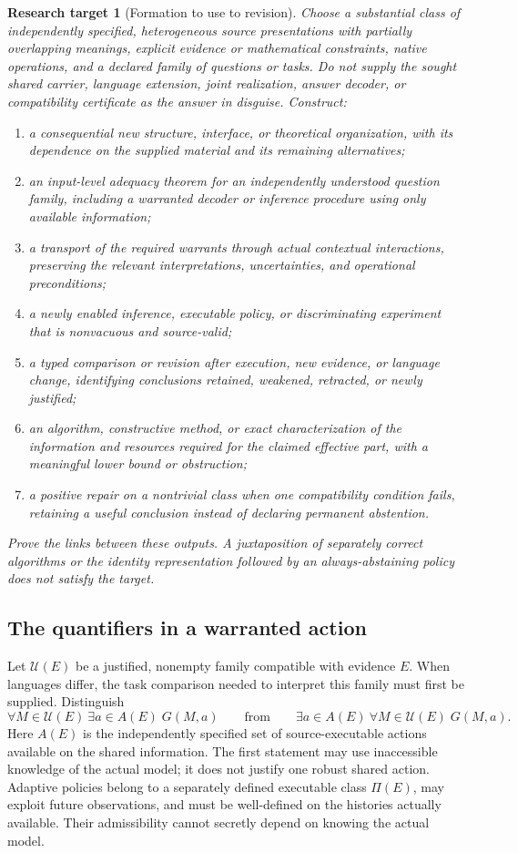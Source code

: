 \documentclass[11pt]{article}
\newtheorem{target}{Research target}[section]
\theoremstyle{definition}
\begin{document}
\begin{target}[Formation to use to revision]
Choose a substantial class of independently specified, heterogeneous source presentations with partially overlapping meanings, explicit evidence or mathematical constraints, native operations, and a declared family of questions or tasks. Do not supply the sought shared carrier, language extension, joint realization, answer decoder, or compatibility certificate as the answer in disguise. Construct:
\begin{enumerate}
\item a consequential new structure, interface, or theoretical organization, with its dependence on the supplied material and its remaining alternatives;
\item an input-level adequacy theorem for an independently understood question family, including a warranted decoder or inference procedure using only available information;
\item a transport of the required warrants through actual contextual interactions, preserving the relevant interpretations, uncertainties, and operational preconditions;
\item a newly enabled inference, executable policy, or discriminating experiment that is nonvacuous and source-valid;
\item a typed comparison or revision after execution, new evidence, or language change, identifying conclusions retained, weakened, retracted, or newly justified;
\item an algorithm, constructive method, or exact characterization of the information and resources required for the claimed effective part, with a meaningful lower bound or obstruction;
\item a positive repair on a nontrivial class when one compatibility condition fails, retaining a useful conclusion instead of declaring permanent abstention.
\end{enumerate}
Prove the links between these outputs. A juxtaposition of separately correct algorithms or the identity representation followed by an always-abstaining policy does not satisfy the target.
\end{target}

\subsection{The quantifiers in a warranted action}

Let $\mathcal U(E)$ be a justified, nonempty family compatible with evidence $E$. When languages differ, the task comparison needed to interpret this family must first be supplied. Distinguish
\[
 \forall M\in\mathcal U(E)\ \exists a\in A(E)\;G(M,a)
 \qquad\text{from}\qquad
 \exists a\in A(E)\ \forall M\in\mathcal U(E)\;G(M,a).
\]
Here $A(E)$ is the independently specified set of source-executable actions available on the shared information. The first statement may use inaccessible knowledge of the actual model; it does not justify one robust shared action. Adaptive policies belong to a separately defined executable class $\Pi(E)$, may exploit future observations, and must be well-defined on the histories actually available. Their admissibility cannot secretly depend on knowing the actual model.
\end{document}
